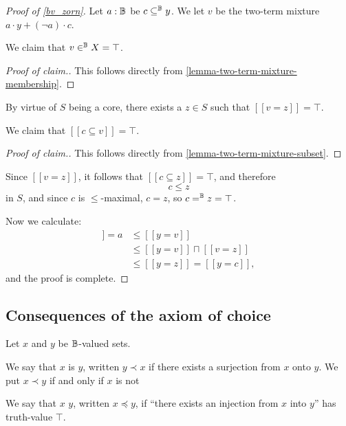 \documentclass[11pt]{article}
\begin{document}
\begin{proof}[Proof of \ref{bv_zorn}]
Let $a : \mathbb{B}$ be $c \subseteq^{\mathbb{B}} y$. We let $v$ be the two-term mixture $a \cdot y + (\neg a) \cdot c$.

We claim that $v \in^{\mathbb{B}} X = \top$.
\begin{proof}[Proof of claim.]
This follows directly from \ref{lemma-two-term-mixture-membership}.
\end{proof}

By virtue of $S$ being a core, there exists a $z \in S$ such that $[[v = z]] = \top$.

We claim that $[[c \subseteq v]] = \top$.
\begin{proof}[Proof of claim.]
This follows directly from \ref{lemma-two-term-mixture-subset}.
\end{proof}

Since $[[v = z]]$, it follows that $[[c \subseteq z]] = \top$, and therefore
$$
c \leq z
$$
in $S$, and since $c$ is $\leq$-maximal, $c = z$, so $c =^{\mathbb{B}} z = \top$.

Now we calculate:
\begin{align*}
  [[c \subseteq y]] = a &\leq [[y = v]]\\
                        &\leq [[y = v]] \sqcap [[v = z]]\\
                        &\leq [[y = z]] = [[y = c]],
\end{align*}
and the proof is complete.
\end{proof}

\subsection{Consequences of the axiom of choice}

{Let $x$ and $y$ be $\mathbb{B}$-valued sets.

We say that $x$ is  $y$, written $y \prec x$ if there exists a surjection from $x$ onto $y$. We put $x \prec y$ if and only if $x$ is not 

We say that $x$  $y$, written $x \preceq y$, if ``there exists an injection from $x$ into $y$'' has truth-value $\top$.}
\end{document}
